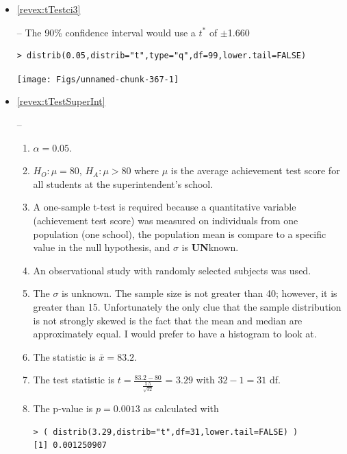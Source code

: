 \documentclass[10pt,openany]{book}\usepackage[]{graphicx}\usepackage[]{color}
\makeatletter
\newenvironment{kframe}{%
 \def\at@end@of@kframe{}%
 \ifinner\ifhmode%
  \def\at@end@of@kframe{\end{minipage}}%
  \begin{minipage}{\columnwidth}%
 \fi\fi%
 \def\FrameCommand##1{\hskip\@totalleftmargin \hskip-\fboxsep
 \colorbox{shadecolor}{##1}\hskip-\fboxsep
     \hskip-\linewidth \hskip-\@totalleftmargin \hskip\columnwidth}%
 \MakeFramed {\advance\hsize-\width
   \@totalleftmargin\z@ \linewidth\hsize
   \@setminipage}}%
 {\par\unskip\endMakeFramed%
 \at@end@of@kframe}
\newenvironment{knitrout}{}{} %
\makeatother
\begin{document}
\begin{itemize}
\begin{knitrout}
\end{knitrout}
  \item \hypertarget{ans:tTestci3}{\ref{revex:tTestci3}} -- The 90\% confidence interval would use a $t^{*}$ of $\pm$1.660
\begin{knitrout}
\color{fgcolor}\begin{kframe}
\begin{verbatim}
> distrib(0.05,distrib="t",type="q",df=99,lower.tail=FALSE)
\end{verbatim}
\end{kframe}

{\centering \texttt{[image: Figs/unnamed-chunk-367-1]} 

}



\end{knitrout}

  \item \hypertarget{ans:tTestSuperInt}{\ref{revex:tTestSuperInt}} --
    \begin{enumerate}
      \item $\alpha=0.05$.
      \item $H_{O}:\mu=80$, $H_{A}:\mu>80$ where $\mu$ is the average achievement test score for all students at the superintendent's school.
      \item A one-sample t-test is required because a quantitative variable (achievement test score) was measured on individuals from one population (one school), the population mean is compare to a specific value in the null hypothesis, and $\sigma$ is \textbf{UN}known.
      \item An observational study with randomly selected subjects was used.
      \item The $\sigma$ is unknown.  The sample size is not greater than 40; however, it is greater than 15.  Unfortunately the only clue that the sample distribution is not strongly skewed is the fact that the mean and median are approximately equal.  I would prefer to have a histogram to look at.
      \item The statistic is $\bar{x}=83.2$.
      \item The test statistic is $t=\frac{83.2-80}{\frac{5.5}{\sqrt{32}}}$ = $3.29$ with $32-1=31$ df.
      \item The p-value is $p=0.0013$ as calculated with
\begin{knitrout}
\color{fgcolor}\begin{kframe}
\begin{verbatim}
> ( distrib(3.29,distrib="t",df=31,lower.tail=FALSE) )
[1] 0.001250907
\end{verbatim}
\end{kframe}


\end{knitrout}
\end{enumerate}
\end{itemize}
\end{document}
